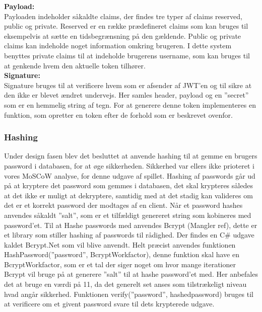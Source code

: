 \textbf{Payload:}\\

Payloaden indeholder såkaldte claims, der findes tre typer af claims reserved, public og private. Reserved er en række prædefineret claims som kan bruges til eksempelvis at sætte en tidsbegrænsning på den gældende. Public og private claims kan indeholde noget information omkring brugeren. I dette system benyttes private claims til at indeholde brugerens username, som kan bruges til at genkende hvem den aktuelle token tilhører.\\

\textbf{Signature:}\\
Signature bruges til at verificere hvem som er afsender af JWT’en og til sikre at den ikke er blevet ændret undervejs. Her samles header, payload og en ”secret” som er en hemmelig string af tegn.
For at generere denne token implementeres en funktion, som opretter en token efter de forhold som er beskrevet ovenfor.\\


\subsubsection{Hashing}
Under design fasen blev det besluttet at anvende hashing til at gemme en brugers password i databasen, for at øge sikkerheden. Sikkerhed var ellers ikke prioteret i vores MoSCoW analyse, for denne udgave af spillet.
Hashing af passwords går ud på at kryptere det password som gemmes i databasen, det skal krypteres således at det ikke er muligt at dekryptere, samtidig med at det stadig kan valideres om det er et korrekt password der modtages af en client. Når et password hashes anvendes såkaldt ”salt”, som er et tilfældigt genereret string som kobineres med password’et.
Til at Hashe passwords med anvendes Bcrypt (Mangler ref), dette er et library som stiller hashing af passwords til rådighed. Der findes en C\# udgave kaldet Bcrypt.Net  som vil blive anvendt. Helt præcist anvendes funktionen HashPassword(”password”, BcryptWorkfactor), denne funktion skal have en BcryptWorkfactor, som er et tal der siger noget om hvor mange iterationer Bcrypt vil bruge på at generere ”salt” til at hashe password’et med. Her anbefales det at bruge en værdi på 11, da det generelt set anses som tilstrækeligt niveau hvad angår sikkerhed.
Funktionen verify(”password”, hashedpassword) bruges til at verificere om et givent password svare til dets krypterede udgave.\\

